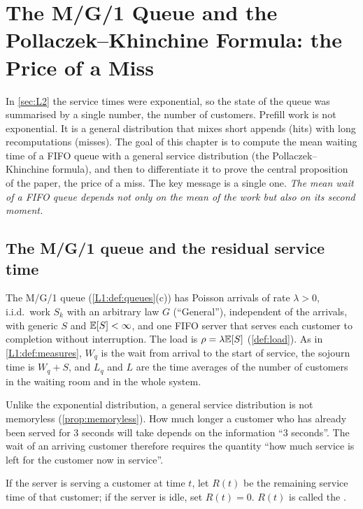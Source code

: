 \chapter{The M/G/1 Queue and the Pollaczek--Khinchine Formula: the Price of a Miss}\label{sec:L3}

In \cref{sec:L2} the service times were exponential, so the state of the queue
was summarised by a single number, the number of customers. Prefill work is not
exponential. It is a general distribution that mixes short appends (hits) with
long recomputations (misses). The goal of this chapter is to compute the mean
waiting time of a FIFO queue with a general service distribution (the
Pollaczek--Khinchine formula), and then to differentiate it to prove the central
proposition of the paper, the price of a miss. The key message is a single one.
\emph{The mean wait of a FIFO queue depends not only on the mean of the work but
also on its second moment.}

\section{The M/G/1 queue and the residual service time}

The M/G/1 queue (\cref{L1:def:queues}(c)) has Poisson arrivals of rate $\lambda>0$,
i.i.d.\ work $S_k$ with an arbitrary law $G$ (``General''), independent of the
arrivals, with generic $S$ and $\mathbb{E}[S]<\infty$, and one FIFO server that serves each
customer to completion without interruption. The load is $\rho=\lambda\mathbb{E}[S]$
(\cref{def:load}). As in \cref{L1:def:measures}, $W_q$ is the wait from arrival to the
start of service, the sojourn time is $W_q+S$, and $L_q$ and $L$ are the time averages
of the number of customers in the waiting room and in the whole system.

Unlike the exponential distribution, a general service distribution is not
memoryless (\cref{prop:memoryless}). How much longer a customer who has already
been served for 3 seconds will take depends on the information ``3 seconds''.
The wait of an arriving customer therefore requires the quantity ``how much
service is left for the customer now in service''.

\begin{definition}\label{L3:def:residual}
If the server is serving a customer at time $t$, let $R(t)$ be the remaining
service time of that customer; if the server is idle, set $R(t)=0$. $R(t)$ is
called the .
\end{definition}

